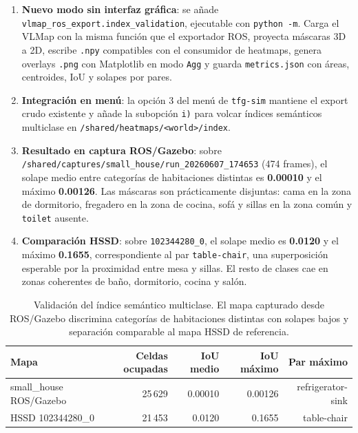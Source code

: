 \begin{enumerate}
  \item \textbf{Nuevo modo sin interfaz gráfica}: se añade
        \texttt{vlmap\_ros\_export.index\_validation}, ejecutable con
        \texttt{python -m}. Carga el VLMap con la misma función que el exportador
        ROS, proyecta máscaras 3D a 2D, escribe \texttt{.npy} compatibles con el
        consumidor de heatmaps, genera overlays \texttt{.png} con Matplotlib en
        modo \texttt{Agg} y guarda \texttt{metrics.json} con áreas, centroides,
        IoU y solapes por pares.
  \item \textbf{Integración en menú}: la opción 3 del menú de \texttt{tfg-sim}
        mantiene el export crudo existente y añade la subopción
        \texttt{i)} para volcar índices semánticos multiclase en
        \texttt{/shared/heatmaps/<world>/index}.
  \item \textbf{Resultado en captura ROS/Gazebo}: sobre
        \texttt{/shared/captures/small\_house/run\_20260607\_174653}
        (474 frames), el solape medio entre categorías de habitaciones distintas
        es \textbf{0.00010} y el máximo \textbf{0.00126}. Las máscaras son
        prácticamente disjuntas: cama en la zona de dormitorio, fregadero en la
        zona de cocina, sofá y sillas en la zona común y \texttt{toilet} ausente.
  \item \textbf{Comparación HSSD}: sobre \texttt{102344280\_0}, el solape medio
        es \textbf{0.0120} y el máximo \textbf{0.1655}, correspondiente al par
        \texttt{table-chair}, una superposición esperable por la proximidad entre
        mesa y sillas. El resto de clases cae en zonas coherentes de baño,
        dormitorio, cocina y salón.
\end{enumerate}

\begin{table}[htbp]
\centering
\begin{tabular}{lrrrr}
\toprule
Mapa & Celdas ocupadas & IoU medio & IoU máximo & Par máximo \\
\midrule
small\_house ROS/Gazebo & 25\,629 & 0.00010 & 0.00126 & refrigerator-sink \\
HSSD 102344280\_0 & 21\,453 & 0.0120 & 0.1655 & table-chair \\
\bottomrule
\end{tabular}
\caption{Validación del índice semántico multiclase. El mapa capturado desde
ROS/Gazebo discrimina categorías de habitaciones distintas con solapes bajos y
separación comparable al mapa HSSD de referencia.}
\end{table}

